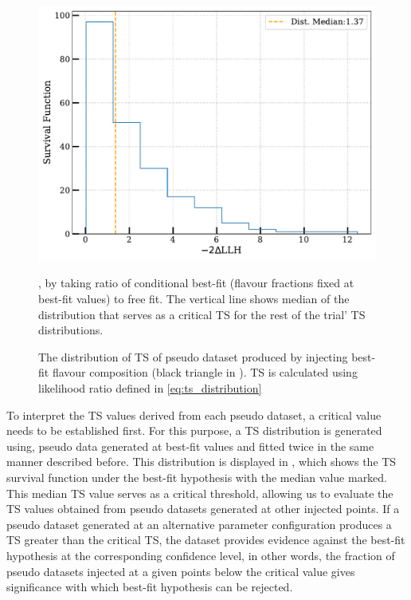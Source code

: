 \begin{figure}[h!]
    
    \includegraphics{./figures/results/median_atbestfit_TS.pdf}


    \caption[The distribution of TS of pseudo dataset produced by injecting best-fit flavour composition (black triangle in )]{The distribution of TS of pseudo dataset produced by injecting best-fit flavour composition (black triangle in ). TS is calculated using likelihood ratio defined in \ref{eq:ts_distribution}}, by taking ratio of conditional best-fit (flavour fractions fixed at best-fit values) to free fit. The vertical line shows median of the distribution that serves as a critical TS for the rest of the trial' TS distributions.
\end{figure}
To interpret the TS values derived from each pseudo dataset, a critical value needs to be established first. For this purpose, a TS distribution is generated using, pseudo data generated at best-fit values and fitted twice in the same manner described before. This distribution is displayed in , which shows the TS survival function under the best-fit hypothesis with the median value marked. This median TS value serves as a critical threshold, allowing us to evaluate the TS values obtained from pseudo datasets generated at other injected points. If a pseudo dataset generated at an alternative parameter configuration produces a TS greater than the critical TS, the dataset provides evidence against the best-fit hypothesis at the corresponding confidence level, in other words, the fraction of pseudo datasets injected at a given points below the critical value gives significance with which best-fit hypothesis can be rejected. 

